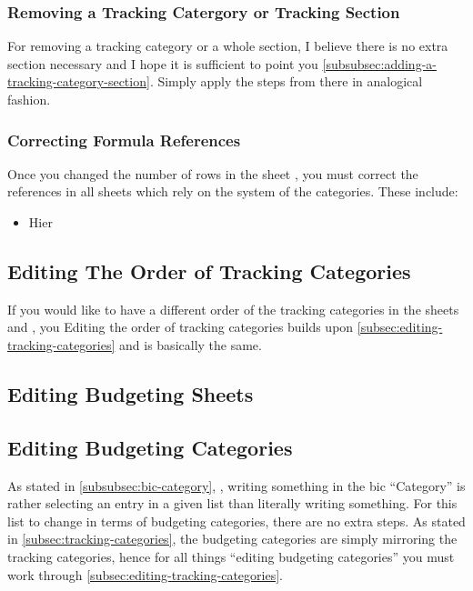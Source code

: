 \subsubsection{Removing a Tracking Catergory or Tracking Section}
\label{subsubsec:removing-a-tracking-category-section}

For removing a tracking category or a whole section, I believe there is no extra section necessary and I hope it is sufficient to point you \autoref{subsubsec:adding-a-tracking-category-section}.
Simply apply the steps from there in analogical fashion.

\subsubsection{Correcting Formula References}
\label{subsubsec:correct-formula-references}

Once you changed the number of rows in the sheet , you must correct the references in all sheets which rely on the system of the categories.
These include:
\begin{itemize}
	\item Hier
\end{itemize}

\subsection{Editing The Order of Tracking Categories}
\label{subsec:editing-order-of-tracking-categories}

If you would like to have a different order of the tracking categories in the sheets  and , you 
Editing the order of tracking categories builds upon \autoref{subsec:editing-tracking-categories} and is basically the same.

\subsection{Editing Budgeting Sheets}
\label{subsec:editing-budgeting-sheets}

\subsection{Editing Budgeting Categories}
\label{subsec:editing-categories-for-budgeting}

As stated in \autoref{subsubsec:bic-category}, , writing something in the \ac{bic} ``Category'' is rather selecting an entry in a given list than literally writing something.
For this list to change in terms of budgeting categories, there are no extra steps.
As stated in \autoref{subsec:tracking-categories}, the budgeting categories are simply mirroring the tracking categories, hence for all things ``editing budgeting categories'' you must work through \autoref{subsec:editing-tracking-categories}.